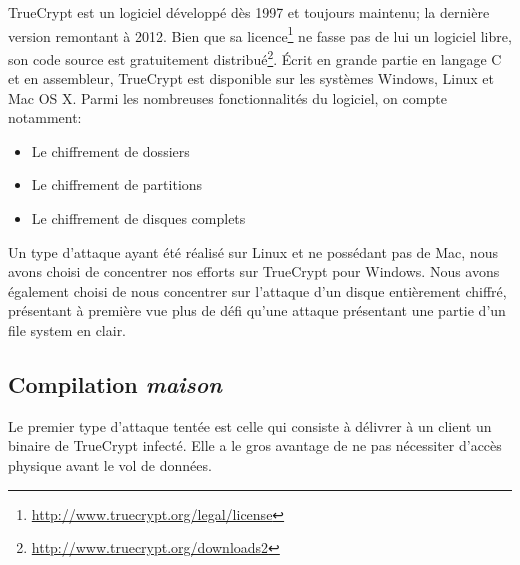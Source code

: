 \documentclass[12pt,a4paper]{article}
\begin{document}
TrueCrypt est un logiciel développé dès 1997 et toujours maintenu; la dernière version remontant à 2012. Bien que sa licence\footnote{\url{http://www.truecrypt.org/legal/license}} ne fasse pas de lui un logiciel libre, son code source est gratuitement distribué\footnote{\url{http://www.truecrypt.org/downloads2}}. Écrit en grande partie en langage C et en assembleur, TrueCrypt est disponible sur les systèmes Windows, Linux et Mac OS X. Parmi les nombreuses fonctionnalités du logiciel, on compte notamment:
\begin{itemize}
	\item Le chiffrement de dossiers
	\item Le chiffrement de partitions
	\item Le chiffrement de disques complets
\end{itemize}

Un type d'attaque ayant été réalisé sur Linux et ne possédant pas de Mac, nous avons choisi de concentrer nos efforts sur TrueCrypt pour Windows. Nous avons également choisi de nous concentrer sur l'attaque d'un disque entièrement chiffré, présentant à première vue plus de défi qu'une attaque présentant une partie d'un file system en clair.

\subsection{Compilation \textit{maison}}

Le premier type d'attaque tentée est celle qui consiste à délivrer à un client un binaire de TrueCrypt infecté. Elle a le gros avantage de ne pas nécessiter d'accès physique avant le vol de données.
\end{document}
